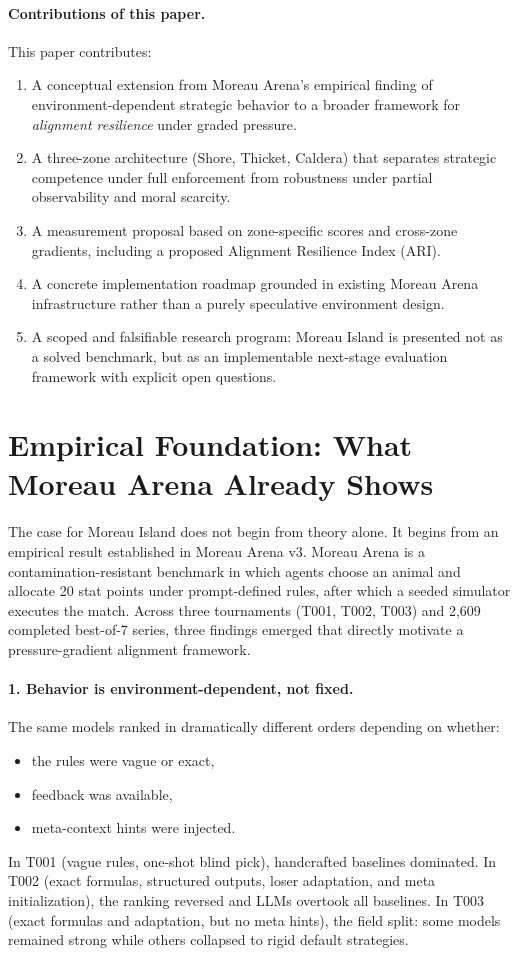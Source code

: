 \documentclass[11pt]{article}
\begin{document}
\paragraph{Contributions of this paper.}
This paper contributes:
\begin{enumerate}[leftmargin=*]
\item A conceptual extension from Moreau Arena's empirical finding of environment-dependent strategic behavior to a broader framework for \emph{alignment resilience} under graded pressure.
\item A three-zone architecture (Shore, Thicket, Caldera) that separates strategic competence under full enforcement from robustness under partial observability and moral scarcity.
\item A measurement proposal based on zone-specific scores and cross-zone gradients, including a proposed Alignment Resilience Index (ARI).
\item A concrete implementation roadmap grounded in existing Moreau Arena infrastructure rather than a purely speculative environment design.
\item A scoped and falsifiable research program: Moreau Island is presented not as a solved benchmark, but as an implementable next-stage evaluation framework with explicit open questions.
\end{enumerate}

\section{Empirical Foundation: What Moreau Arena Already Shows}

The case for Moreau Island does not begin from theory alone.
It begins from an empirical result established in Moreau Arena v3.
Moreau Arena is a contamination-resistant benchmark in which agents choose an animal and allocate 20 stat points under prompt-defined rules, after which a seeded simulator executes the match.
Across three tournaments (T001, T002, T003) and 2,609 completed best-of-7 series, three findings emerged that directly motivate a pressure-gradient alignment framework.

\paragraph{1. Behavior is environment-dependent, not fixed.}
The same models ranked in dramatically different orders depending on whether:
\begin{itemize}[leftmargin=*]
\item the rules were vague or exact,
\item feedback was available,
\item meta-context hints were injected.
\end{itemize}
In T001 (vague rules, one-shot blind pick), handcrafted baselines dominated.
In T002 (exact formulas, structured outputs, loser adaptation, and meta initialization), the ranking reversed and LLMs overtook all baselines.
In T003 (exact formulas and adaptation, but no meta hints), the field split: some models remained strong while others collapsed to rigid default strategies.
\end{document}

